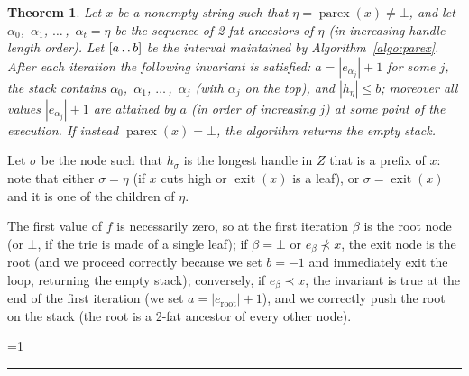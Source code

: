 \documentclass[a4paper]{article}
\newcounter{noqed}
\newcommand{\qed}{ \ifmmode\mbox{
}\fi\rule[-.05em]{.3em}{.7em}\setcounter{noqed}{0}}
\newenvironment{proof}[1][{}]{\noindent{\bf Proof#1.
}\setcounter{noqed}{1}}{\ifnum\value{noqed}=1\qed\fi\par\medskip}
\newtheorem{theorem}{Theorem}
\newcommand{\exit}[1]{\operatorname{exit}(#1)}
\newcommand{\parex}[1]{\operatorname{parex}(#1)}
\newcommand{\?}{\mskip1.5mu}
\newcommand{\lst}[2]{${#1}_0$,~${#1}_1$, $\dots\,$,~${#1}_{#2}$}
\def\..{\,\mathpunct{\ldotp\ldotp}} %
\begin{document}
\begin{theorem}
\label{th:parex}
Let $x$ be a nonempty string such that $\eta=\parex x\neq\bot$, and let 
$\alpha_0$,~$\alpha_1$, $\dots\,$,~${\alpha}_{t}=\eta$
be the sequence of 2-fat ancestors of $\eta$ (in increasing handle-length order).
Let $[a\..b]$ be the interval maintained by 
  Algorithm~\ref{algo:parex}. After each iteration the following
  invariant is satisfied: $a=|e_{\alpha_j}|+1$ for some $j$, the stack contains \lst\alpha j
  (with $\alpha_j$ on the top), and $|h_\eta|\leq b$; moreover 
  all values $|e_{\alpha_j}|+1$ are attained by $a$
  (in order of increasing $j$) at some point of the execution. If instead $\parex x=\bot$, 
  the algorithm returns the empty stack.
\end{theorem}
\begin{proof}
Let $\sigma$ be the node such that $h_\sigma$ is the longest handle in $Z$ that is a prefix of $x$:
note that either $\sigma=\eta$ (if $x$ cuts high or $\exit x$ is a leaf), or $\sigma=\exit x$ and
it is one of the children of $\eta$.  

The first value of $f$ is necessarily zero, so at the first iteration $\beta$ is the root node 
(or $\bot$, if the trie is made of a single leaf);
if $\beta=\bot$ or $e_\beta\not\prec x$, the exit node is the root (and we proceed correctly because we set $b=-1$ and immediately
exit the loop, returning the empty stack); conversely, if $e_\beta\prec x$, the invariant is true at the end of the first iteration (we set $a=|e_{\mathrm{root}}|+1$),
and we correctly push the root on the stack (the root is a 2-fat ancestor of every other node).


\end{proof}
\end{document}
